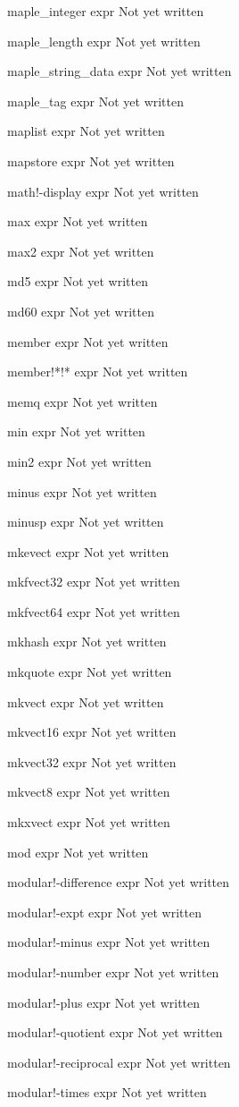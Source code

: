 \documentclass[a4paper,11pt]{article}
\begin{document}
\begin{description}
maple\_integer expr
Not yet written

maple\_length expr
Not yet written

maple\_string\_data expr
Not yet written

maple\_tag expr
Not yet written

maplist expr
Not yet written

mapstore expr
Not yet written

math!-display expr
Not yet written

max expr
Not yet written

max2 expr
Not yet written

md5 expr
Not yet written

md60 expr
Not yet written

member expr
Not yet written

member!*!* expr
Not yet written

memq expr
Not yet written

min expr
Not yet written

min2 expr
Not yet written

minus expr
Not yet written

minusp expr
Not yet written

mkevect expr
Not yet written

mkfvect32 expr
Not yet written

mkfvect64 expr
Not yet written

mkhash expr
Not yet written

mkquote expr
Not yet written

mkvect expr
Not yet written

mkvect16 expr
Not yet written

mkvect32 expr
Not yet written

mkvect8 expr
Not yet written

mkxvect expr
Not yet written

mod expr
Not yet written

modular!-difference expr
Not yet written

modular!-expt expr
Not yet written

modular!-minus expr
Not yet written

modular!-number expr
Not yet written

modular!-plus expr
Not yet written

modular!-quotient expr
Not yet written

modular!-reciprocal expr
Not yet written

modular!-times expr
Not yet written


\end{description}
\end{document}
